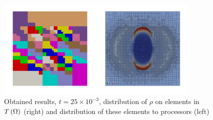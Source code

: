 \begin{figure}[H]
	\begin{center}
		\includegraphics[width=0.87\textwidth]{img/mhd-blast/old/mya6.jpg}
	\caption{Obtained results, $t = 25\times 10^{-3}$, distribution of $\rho$ on elements in $T\left(\Omega\right)$ (right) and distribution of these elements to processors (left)}
	\label{figure:blastOldMyAdapt6}
	\end{center}
\end{figure}
\vspace{-8mm}

